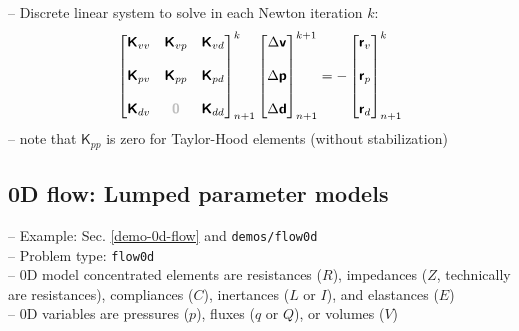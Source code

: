 \documentclass[a4paper,12pt]{report}
\newcommand{\bs}[1]{\boldsymbol{#1}}
\newcommand{\zerom}{\textcolor{lightgray}{\bs{\mathsf{0}}}}
\newcommand{\ROP}{\bs{\mathsf{r}}}
\begin{document}
-- Discrete linear system to solve in each Newton iteration $k$:
\begin{equation}
\label{equation-lin-sys-fluid-ale}
\begin{aligned}
\begin{bmatrix} \boldsymbol{\mathsf{K}}_{vv} & \boldsymbol{\mathsf{K}}_{vp} & \boldsymbol{\mathsf{K}}_{vd} \\ \\ \boldsymbol{\mathsf{K}}_{pv} & \boldsymbol{\mathsf{K}}_{pp} & \boldsymbol{\mathsf{K}}_{pd} \\ \\ \boldsymbol{\mathsf{K}}_{dv}  & \zerom & \boldsymbol{\mathsf{K}}_{dd} \end{bmatrix}_{n+1}^{k}\begin{bmatrix} \Delta\boldsymbol{\mathsf{v}} \\ \\ \Delta\boldsymbol{\mathsf{p}} \\ \\ \Delta\boldsymbol{\mathsf{d}} \end{bmatrix}_{n+1}^{k+1}=-\begin{bmatrix} \ROP_{v} \\ \\ \ROP_{p} \\ \\ \ROP_{d} \end{bmatrix}_{n+1}^{k} 
\end{aligned}
\end{equation}
-- note that $\boldsymbol{\mathsf{K}}_{pp}$ is zero for Taylor-Hood elements (without stabilization)


\subsection{0D flow: Lumped parameter models}\label{d-flow-lumped-parameter-models}

-- Example: Sec. \ref{demo-0d-flow} and \verb"demos/flow0d"\\

-- Problem type: \verb"flow0d"\\

-- 0D model concentrated elements are resistances ($R$), impedances ($Z$, technically are resistances), compliances ($C$), inertances ($L$ or $I$), and elastances ($E$)\\

-- 0D variables are pressures ($p$), fluxes ($q$ or $Q$), or volumes ($V$)
\end{document}
